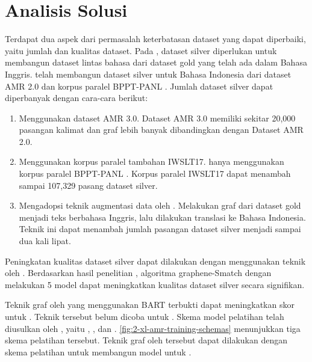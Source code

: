 \section{Analisis Solusi}

Terdapat dua aspek dari permasalah keterbatasan dataset yang dapat diperbaiki, yaitu jumlah dan kualitas dataset.
Pada \amrparsing{}, dataset silver diperlukan untuk membangun dataset lintas bahasa dari dataset gold yang telah ada dalam Bahasa Inggris.
\textcite{putra2022} telah membangun dataset silver untuk Bahasa Indonesia dari dataset AMR 2.0 dan korpus paralel BPPT-PANL .
Jumlah dataset silver dapat diperbanyak dengan cara-cara berikut:
\begin{enumerate}
  \item Menggunakan dataset AMR 3.0.
  Dataset AMR 3.0 memiliki sekitar 20,000 pasangan kalimat dan graf \AMR{} lebih banyak dibandingkan dengan Dataset AMR 2.0.

  \item Menggunakan korpus paralel tambahan IWSLT17.
  \textcite{putra2022} hanya menggunakan korpus paralel BPPT-PANL .
  Korpus paralel IWSLT17  dapat menambah sampai 107,329 pasang dataset silver.

  \item Mengadopsi teknik augmentasi data oleh \textcite{lee2022}.
  Melakukan  graf \AMR{} dari dataset gold menjadi teks berbahasa Inggris, lalu dilakukan translasi ke Bahasa Indonesia.
  Teknik ini dapat menambah jumlah pasangan dataset silver menjadi sampai dua kali lipat.
\end{enumerate}

Peningkatan kualitas dataset silver dapat dilakukan dengan menggunakan teknik  oleh \textcite{lee2022}.
Berdasarkan hasil penelitian \textcite{lee2022}, algoritma graphene-Smatch  dengan melakukan  5 model  \AMR{}  dapat meningkatkan kualitas dataset silver secara signifikan.

Teknik \pretraining{} graf oleh \textcite{bai2022} yang menggunakan  \gls{BART} terbukti dapat meningkatkan skor \SMATCH{} untuk \amrparsing{}.
Teknik tersebut belum dicoba untuk \crosslingual{} \amrparsing{}.
Skema model pelatihan \crosslingual{} \amrparsing{} telah diusulkan oleh \textcite{blloshmi2020}, yaitu , , dan .
\cref{fig:2-xl-amr-training-schemas} menunjukkan tiga skema pelatihan tersebut.
Teknik \pretraining{} graf oleh \textcite{bai2022} tersebut dapat dilakukan dengan skema pelatihan \textcite{blloshmi2020} untuk membangun model \crosslingual{} untuk  \amrparsing{}.

